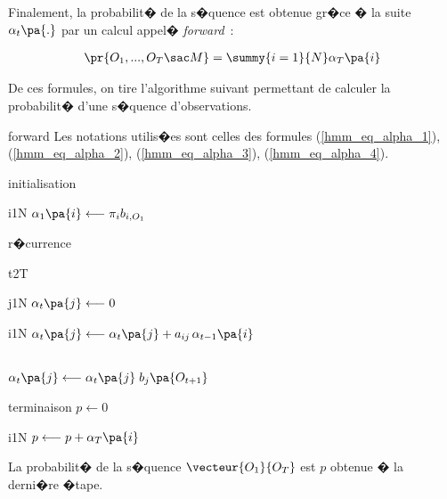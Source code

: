 Finalement, la probabilit� de la s�quence est obtenue gr�ce � la suite $\alpha_t\pa{.}$ par un calcul appel� \emph{forward}~:

        
        \begin{eqnarray}
        \pr {O_{1},...,O_{T} \sac M}  = \summy{i=1}{N} \alpha_{T}\pa{i}\label{hmm_eq_alpha_4}
        \end{eqnarray}

De ces formules, on tire l'algorithme suivant permettant de calculer la probabilit� d'une s�quence d'observations.

        \begin{xalgorithm}{forward} \label{hmm_algo_forward}
        Les notations utilis�es sont celles des formules (\ref{hmm_eq_alpha_1}), (\ref{hmm_eq_alpha_2}),
        (\ref{hmm_eq_alpha_3}), (\ref{hmm_eq_alpha_4}).
        
        \begin{xalgostep}{initialisation}
                \begin{xfor}{i}{1}{N}
                $\alpha_1\pa{i} \longleftarrow \pi_{i}b_{i,O_{1}}$
                \end{xfor}
        \end{xalgostep}
        
        \begin{xalgostep}{r�currence}
                \begin{xfor}{t}{2}{T}
                        \begin{xfor}{j}{1}{N}
                                $\alpha_{t}\pa{j} \longleftarrow 0$ \\
                                \begin{xfor}{i}{1}{N}
                                        $\alpha_{t}\pa{j} \longleftarrow \alpha_{t}\pa{j} + a_{ij} \, \alpha_{t-1} \pa{i}$
                                \end{xfor} \\
                                $\alpha_{t}\pa{j} \longleftarrow \alpha_{t}\pa{j} \; b_{j}\pa{O_{t+1}}$
                        \end{xfor}
                \end{xfor}
        \end{xalgostep}
        
        \begin{xalgostep}{terminaison}
                $p \longleftarrow 0$ \\
                \begin{xfor}{i}{1}{N}
                        $p \longleftarrow p + \alpha_{T}\pa{i}$
                \end{xfor}
        \end{xalgostep}
        
        La probabilit� de la s�quence $\vecteur{O_1}{O_T}$ est $p$ obtenue � la derni�re �tape.
        
        \end{xalgorithm}
        
